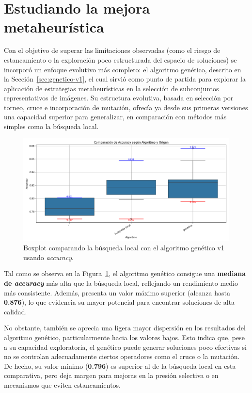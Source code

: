 \section{Estudiando la mejora metaheurística}\label{sec:estudio-mejora-metaheuristica}
Con el objetivo de superar las limitaciones observadas (como el riesgo de estancamiento o la exploración poco estructurada del espacio de soluciones)
se incorporó un enfoque evolutivo más completo: el algoritmo genético, descrito en la Sección~\ref{sec:genetico-v1}, el cual sirvió como punto de partida para explorar la
aplicación de estrategias metaheurísticas en la selección de subconjuntos representativos de imágenes.
Su estructura evolutiva, basada en selección por torneo, cruce e incorporación de mutación,
ofrecía ya desde sus primeras versiones una capacidad superior para generalizar, en comparación con métodos más simples como la búsqueda local.

\begin{figure}[htp]
    \centering
    \includegraphics[width=1\textwidth]{imagenes/evaluaciones/comparacion_bl-gen_v1}
    \caption{Boxplot comparando la búsqueda local con el algoritmo genético v1 usando \textit{accuracy}.}
    \label{fig:bl-vs-gen-v1}
\end{figure}

Tal como se observa en la Figura~\ref{fig:bl-vs-gen-v1}, el algoritmo genético consigue una \textbf{mediana de \textit{accuracy}} más alta que la búsqueda local,
reflejando un rendimiento medio más consistente.
Además, presenta un valor máximo superior (alcanza hasta \textbf{0.876}), lo que evidencia su mayor potencial para encontrar soluciones de alta calidad.

No obstante, también se aprecia una ligera mayor dispersión en los resultados del algoritmo genético, particularmente hacia los valores bajos.
Esto indica que, pese a su capacidad exploratoria, el genético puede generar soluciones poco efectivas si no se controlan adecuadamente ciertos operadores como el cruce o la mutación.
De hecho, su valor mínimo (\textbf{0.796}) es superior al de la búsqueda local en esta comparativa, pero deja margen para mejoras en la presión selectiva o en mecanismos que eviten estancamientos.

